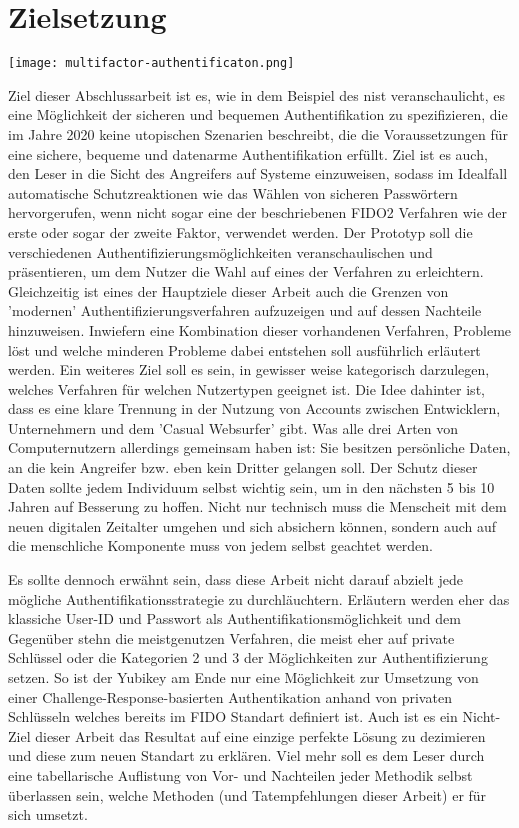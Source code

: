\section{Zielsetzung}
\texttt{[image: multifactor-authentificaton.png]}

Ziel dieser Abschlussarbeit ist es, wie in dem Beispiel des \ac{nist} veranschaulicht, es eine Möglichkeit der sicheren und bequemen Authentifikation zu spezifizieren, die im Jahre 2020 keine utopischen Szenarien beschreibt, die die Voraussetzungen für eine sichere, bequeme und datenarme Authentifikation erfüllt. Ziel ist es auch, den Leser in die Sicht des Angreifers auf Systeme einzuweisen, sodass im Idealfall automatische Schutzreaktionen wie das Wählen von sicheren Passwörtern hervorgerufen, wenn nicht sogar eine der beschriebenen FIDO2 Verfahren wie der erste oder sogar der zweite Faktor, verwendet werden. Der Prototyp soll die verschiedenen Authentifizierungsmöglichkeiten veranschaulischen und präsentieren, um dem Nutzer die Wahl auf eines der Verfahren zu erleichtern. Gleichzeitig ist eines der Hauptziele dieser Arbeit auch die Grenzen von 'modernen' Authentifizierungsverfahren aufzuzeigen und auf dessen Nachteile hinzuweisen. Inwiefern eine Kombination dieser vorhandenen Verfahren, Probleme löst und welche minderen Probleme dabei entstehen soll ausführlich erläutert werden. Ein weiteres Ziel soll es sein, in gewisser weise kategorisch darzulegen, welches Verfahren für welchen Nutzertypen geeignet ist. Die Idee dahinter ist, dass es eine klare Trennung in der Nutzung von Accounts zwischen Entwicklern, Unternehmern und dem 'Casual Websurfer' gibt. Was alle drei Arten von Computernutzern allerdings gemeinsam haben ist: Sie besitzen persönliche Daten, an die kein Angreifer bzw. eben kein Dritter gelangen soll. Der Schutz dieser Daten sollte jedem Individuum selbst wichtig sein, um in den nächsten 5 bis 10 Jahren auf Besserung zu hoffen. Nicht nur technisch muss die Menscheit mit dem neuen digitalen Zeitalter umgehen und sich absichern können, sondern auch auf die menschliche Komponente muss von jedem selbst geachtet werden.

Es sollte dennoch erwähnt sein, dass diese Arbeit nicht darauf abzielt jede mögliche Authentifikationsstrategie zu durchläuchtern. Erläutern werden eher das klassiche User-ID und Passwort als Authentifikationsmöglichkeit und dem Gegenüber stehn die meistgenutzen Verfahren, die meist eher auf private Schlüssel oder die Kategorien 2 und 3 der Möglichkeiten zur Authentifizierung setzen. So ist der Yubikey am Ende nur eine Möglichkeit zur Umsetzung von einer Challenge-Response-basierten Authentikation anhand von privaten Schlüsseln welches bereits im FIDO Standart definiert ist. Auch ist es ein Nicht-Ziel dieser Arbeit das Resultat auf eine einzige perfekte Lösung zu dezimieren und diese zum neuen Standart zu erklären. Viel mehr soll es dem Leser durch eine tabellarische Auflistung von Vor- und Nachteilen jeder Methodik selbst überlassen sein, welche Methoden (und Tatempfehlungen dieser Arbeit) er für sich umsetzt.
